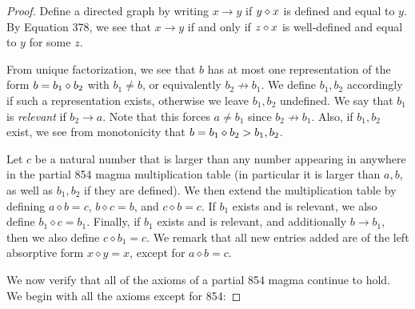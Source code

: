 \begin{proof}  Define a directed graph by writing $x \to y$ if $y \diamond x$ is defined and equal to $y$.  By Equation 378, we see that $x \to y$ if and only if $z \diamond x$ is well-defined and equal to $y$ for some $z$.

  From unique factorization, we see that $b$ has at most one representation of the form $b = b_1 \diamond b_2$ with $b_1 \neq b$, or equivalently $b_2 \not \to b_1$.  We define $b_1, b_2$ accordingly if such a representation exists, otherwise we leave $b_1, b_2$ undefined.  We say that $b_1$ is \emph{relevant} if $b_2 \to a$. Note that this forces $a \neq b_1$ since $b_2 \not \to b_1$.  Also, if $b_1,b_2$ exist, we see from monotonicity that $b = b_1 \diamond b_2 > b_1, b_2$.

  Let $c$ be a natural number that is larger than any number appearing in anywhere in the partial 854 magma multiplication table (in particular it is larger than $a,b$, as well as $b_1,b_2$ if they are defined).  We then extend the multiplication table by  defining $a \diamond b = c$, $b \diamond c = b$, and $c \diamond b = c$.  If $b_1$ exists and is relevant, we also define $b_1 \diamond c = b_1$.  Finally, if $b_1$ exists and is relevant, and additionally $b \to b_1$, then we also define $c \diamond b_1 = c$.  We remark that all new entries added are of the left absorptive form $x \diamond y = x$, except for $a \diamond b = c$.

We now verify that all of the axioms of a partial 854 magma continue to hold.  We begin with all the axioms except for 854:


\end{proof}
